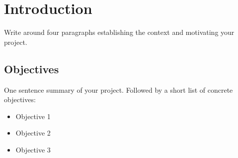 \chapter{Introduction}
\label{ch:introduction} %

Write around four paragraphs establishing the context and motivating your project.




\section{Objectives}
\label{sec:objectives}

One sentence summary of your project. Followed by a short list of concrete objectives:

\begin{itemize}
    \item Objective 1
    \item Objective 2
    \item Objective 3
\end{itemize}
